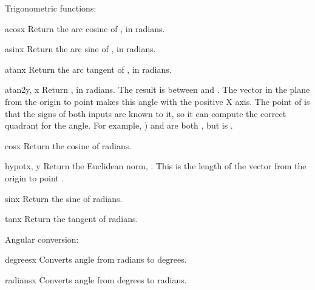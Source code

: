Trigonometric functions:

\begin{funcdesc}{acos}{x}
Return the arc cosine of , in radians.
\end{funcdesc}

\begin{funcdesc}{asin}{x}
Return the arc sine of , in radians.
\end{funcdesc}

\begin{funcdesc}{atan}{x}
Return the arc tangent of , in radians.
\end{funcdesc}

\begin{funcdesc}{atan2}{y, x}
Return , in radians.
The result is between  and .
The vector in the plane from the origin to point 
makes this angle with the positive X axis.
The point of  is that the signs of both inputs are
known to it, so it can compute the correct quadrant for the angle.
For example, ) and  are both ,
but  is .
\end{funcdesc}

\begin{funcdesc}{cos}{x}
Return the cosine of  radians.
\end{funcdesc}

\begin{funcdesc}{hypot}{x, y}
Return the Euclidean norm, .
This is the length of the vector from the origin to point
.
\end{funcdesc}

\begin{funcdesc}{sin}{x}
Return the sine of  radians.
\end{funcdesc}

\begin{funcdesc}{tan}{x}
Return the tangent of  radians.
\end{funcdesc}

Angular conversion:

\begin{funcdesc}{degrees}{x}
Converts angle  from radians to degrees.
\end{funcdesc}

\begin{funcdesc}{radians}{x}
Converts angle  from degrees to radians.
\end{funcdesc}

